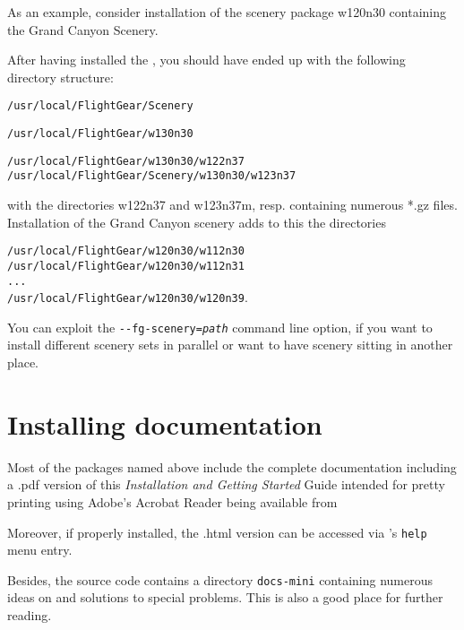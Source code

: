 As an example, consider installation of the scenery package w120n30 containing the Grand
Canyon Scenery.

After having installed the , you should have ended up with the
following directory structure:
\medskip

\noindent
 \texttt{/usr/local/FlightGear/Scenery}

\noindent
 \texttt{/usr/local/FlightGear/w130n30}

\noindent
 \texttt{/usr/local/FlightGear/w130n30/w122n37}\\
 \texttt{/usr/local/FlightGear/Scenery/w130n30/w123n37}
 \medskip

\noindent 
 with the directories w122n37 and w123n37m, resp. containing numerous *.gz
files. Installation of the Grand Canyon scenery adds to this the directories
\medskip

\noindent
 \texttt{/usr/local/FlightGear/w120n30/w112n30}\\
 \texttt{/usr/local/FlightGear/w120n30/w112n31}\\
 \texttt{...}\\
 \texttt{/usr/local/FlightGear/w120n30/w120n39}.
 \medskip

You can exploit the \texttt{-$ $-fg-scenery={\it path}} command line option, if you want to install different scenery sets in parallel or want to have scenery sitting in another place.

\section{Installing documentation}

Most of the packages named above include the complete \FlightGear{} documentation
including a .pdf version of this \textit{Installation and Getting Started} Guide intended
for pretty printing using Adobe's Acrobat Reader being available from
 \medskip

 \medskip

 \noindent
 Moreover, if properly installed, the .html version can be accessed via
\FlightGear{}'s \texttt{help} menu entry.

Besides, the source code contains a directory \texttt{docs-mini} containing numerous
ideas on and solutions to special problems. This is also a good place for further
reading.

